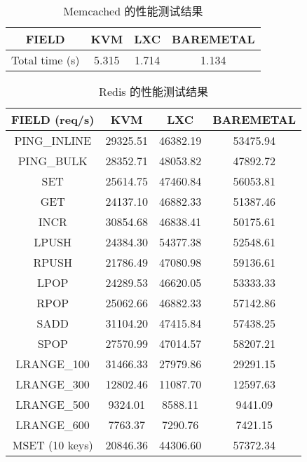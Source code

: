 \begin{table}[H]
    \centering
    \caption{Memcached 的性能测试结果}
    \begin{tabular}{||c c c c||}
        \hline
        FIELD & KVM & LXC & BAREMETAL \\
        \hline
        \hline
        Total time (s) & 5.315 & 1.714 & 1.134 \\
        \hline
    \end{tabular}
    \label{tab:memcached-perf}
\end{table}

\begin{table}[H]
    \centering
    \caption{Redis 的性能测试结果}
    \begin{tabular}{||c c c c||}
        \hline
        FIELD (req/s) & KVM & LXC & BAREMETAL \\
        \hline
        \hline
        PING\_INLINE & 29325.51 & 46382.19 & 53475.94 \\
        \hline
        PING\_BULK & 28352.71 & 48053.82 & 47892.72 \\
        \hline
        SET & 25614.75 & 47460.84 & 56053.81 \\
        \hline
        GET & 24137.10 & 46882.33 & 51387.46 \\
        \hline
        INCR & 30854.68 & 46838.41 & 50175.61 \\
        \hline
        LPUSH & 24384.30 & 54377.38 & 52548.61 \\
        \hline
        RPUSH & 21786.49 & 47080.98 & 59136.61 \\
        \hline
        LPOP & 24289.53 & 46620.05 & 53333.33 \\
        \hline
        RPOP & 25062.66 & 46882.33 & 57142.86 \\
        \hline
        SADD & 31104.20 & 47415.84 & 57438.25 \\
        \hline
        SPOP & 27570.99 & 47014.57 & 58207.21 \\
        \hline
        LRANGE\_100 & 31466.33 & 27979.86 & 29291.15 \\
        \hline
        LRANGE\_300 & 12802.46 & 11087.70 & 12597.63 \\
        \hline
        LRANGE\_500 & 9324.01 & 8588.11 & 9441.09 \\
        \hline
        LRANGE\_600 & 7763.37 & 7290.76 & 7421.15 \\
        \hline
        MSET (10 keys) & 20846.36 & 44306.60 & 57372.34 \\
        \hline
    \end{tabular}
    \label{tab:redis-perf}
\end{table}

